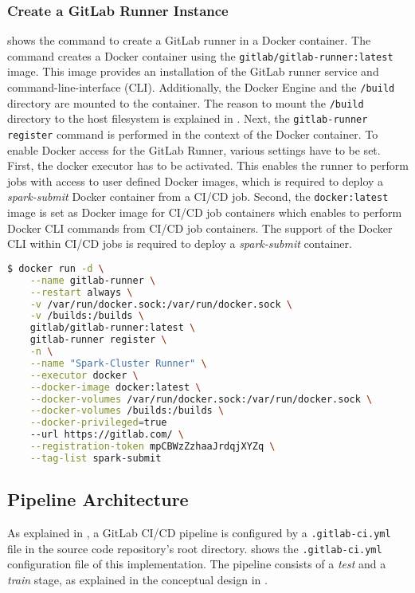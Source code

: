\subsubsection{Create a GitLab Runner Instance}
 shows the command to create a GitLab runner in a Docker container.
The command creates a Docker container using the \texttt{gitlab/gitlab-runner:latest} image. This image provides an installation of the GitLab runner service and command-line-interface (CLI). Additionally, the Docker Engine and the \texttt{/build} directory are mounted to the container. The reason to mount the \texttt{/build} directory to the host filesystem is explained in .
Next, the \texttt{gitlab-runner register} command is performed in the context of the Docker container.
To enable Docker access for the GitLab Runner, various settings have to be set. First, the docker executor has to be activated. This enables the runner to perform jobs with access to user defined Docker images, which is required to deploy a \textit{spark-submit} Docker container from a CI/CD job. Second, the \texttt{docker:latest} image is set as Docker image for CI/CD job containers which enables to perform Docker CLI commands from CI/CD job containers.
%
The support of the Docker CLI within CI/CD jobs is required to deploy a \textit{spark-submit} container.
\begin{lstlisting}[label=lst:06_ci_runner_container_cmd, caption=CLI command to start a GitLab runner in a Docker container, language=bash, numbers=none]
$ docker run -d \
    --name gitlab-runner \
    --restart always \
    -v /var/run/docker.sock:/var/run/docker.sock \
    -v /builds:/builds \
    gitlab/gitlab-runner:latest \
    gitlab-runner register \
    -n \
    --name "Spark-Cluster Runner" \
    --executor docker \
    --docker-image docker:latest \
    --docker-volumes /var/run/docker.sock:/var/run/docker.sock \
    --docker-volumes /builds:/builds \
    --docker-privileged=true
    --url https://gitlab.com/ \
    --registration-token mpCBWzZzhaaJrdqjXYZq \
    --tag-list spark-submit
\end{lstlisting}


\subsection{Pipeline Architecture}
%
As explained in , a GitLab CI/CD pipeline is configured by a \texttt{.gitlab-ci.yml} file in the source code repository's root directory.
%
 shows the \texttt{.gitlab-ci.yml}  configuration file of this implementation. The pipeline consists of a \textit{test} and a \textit{train} stage, as explained in the conceptual design in .


